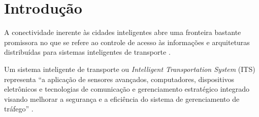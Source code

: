 \documentclass[
	12pt,				%
	oneside,			%
	a4paper,			%
	english,			%
	brazil				%
	]{abntex2ppgsi}
\begin{document}
%
% 

\tableofcontents*
\cleardoublepage



\textual



% 
%
%
\chapter{Introdução}

A conectividade inerente às cidades inteligentes abre uma fronteira bastante promissora no que se refere ao controle de acesso às informações \cite{li2010travel} \cite{zhu2015intelligent} e arquiteturas distribuídas para sistemas inteligentes de transporte \cite{ice2001regional}.

Um sistema inteligente de transporte ou \textit{Intelligent Transportation System} (ITS) representa ``a aplicação de sensores avançados, computadores, dispositivos eletrônicos e tecnologias de comunicação e gerenciamento estratégico integrado visando melhorar a segurança e a eficiência do sistema de gerenciamento de tráfego'' \cite{nasim2012distributed}.
\end{document}
